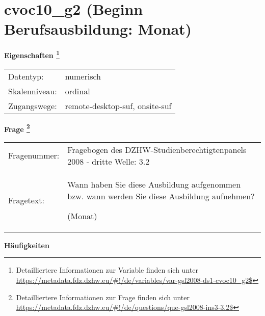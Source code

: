 
    \setcounter{footnote}{0}

    \vspace*{-1.8cm}
	\section{cvoc10\_g2 (Beginn Berufsausbildung: Monat)}
	\label{section:cvoc10_g2}



    \vspace*{0.5cm}
    \noindent\textbf{Eigenschaften
	\footnote{Detailliertere Informationen zur Variable finden sich unter
		\url{https://metadata.fdz.dzhw.eu/\#!/de/variables/var-gsl2008-ds1-cvoc10_g2$}}}\\
	\begin{tabularx}{\hsize}{@{}lX}
	Datentyp: & numerisch \\
	Skalenniveau: & ordinal \\
	Zugangswege: &
	  remote-desktop-suf, 
	  onsite-suf
 \\
    \end{tabularx}



				\vspace*{0.5cm}
                \noindent\textbf{Frage
	                \footnote{Detailliertere Informationen zur Frage finden sich unter
		              \url{https://metadata.fdz.dzhw.eu/\#!/de/questions/que-gsl2008-ins3-3.2$}}}\\
				\begin{tabularx}{\hsize}{@{}lX}
					Fragenummer: &
					  Fragebogen des DZHW-Studienberechtigtenpanels 2008 - dritte Welle:
					  3.2
 \\
					Fragetext: & Wann haben Sie diese Ausbildung aufgenommen bzw. wann werden Sie diese Ausbildung aufnehmen?\par  (Monat) \\
				\end{tabularx}





        		\vspace*{0.5cm}
                \noindent\textbf{Häufigkeiten}

